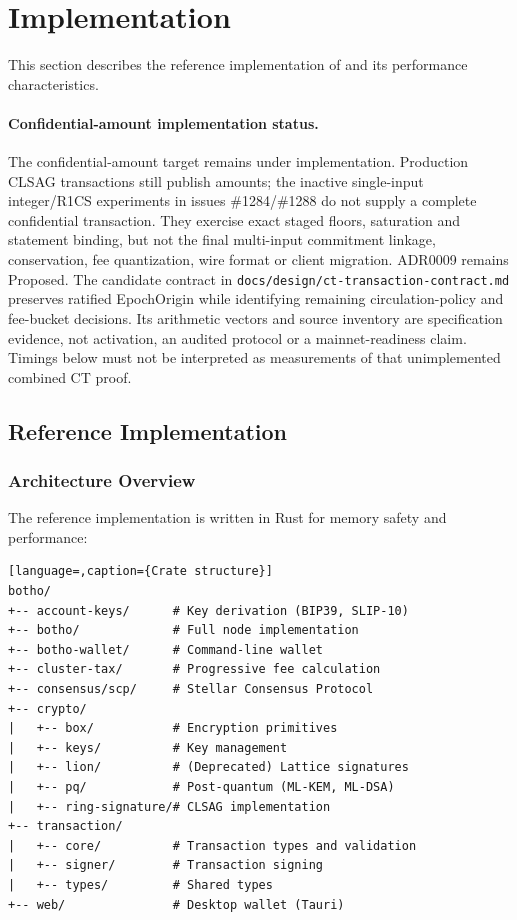 
\section{Implementation}
\label{sec:implementation}

This section describes the reference implementation of \Botho and its
performance characteristics.

\paragraph{Confidential-amount implementation status.}
The confidential-amount target remains under implementation. Production CLSAG
transactions still publish amounts; the inactive single-input integer/R1CS
experiments in issues \#1284/\#1288 do not supply a complete confidential
transaction. They exercise exact staged floors, saturation and statement binding,
but not the final multi-input commitment linkage, conservation, fee quantization,
wire format or client migration. ADR0009 remains Proposed. The candidate contract
in \texttt{docs/design/ct-transaction-contract.md} preserves ratified EpochOrigin
while identifying remaining circulation-policy and fee-bucket decisions.
Its arithmetic vectors and source inventory are specification evidence, not
activation, an audited protocol or a mainnet-readiness claim. Timings below must
not be interpreted as measurements of that unimplemented combined CT proof.

\subsection{Reference Implementation}

\subsubsection{Architecture Overview}

The reference implementation is written in Rust for memory safety and
performance:

\begin{lstlisting}[language=,caption={Crate structure}]
botho/
+-- account-keys/      # Key derivation (BIP39, SLIP-10)
+-- botho/             # Full node implementation
+-- botho-wallet/      # Command-line wallet
+-- cluster-tax/       # Progressive fee calculation
+-- consensus/scp/     # Stellar Consensus Protocol
+-- crypto/
|   +-- box/           # Encryption primitives
|   +-- keys/          # Key management
|   +-- lion/          # (Deprecated) Lattice signatures
|   +-- pq/            # Post-quantum (ML-KEM, ML-DSA)
|   +-- ring-signature/# CLSAG implementation
+-- transaction/
|   +-- core/          # Transaction types and validation
|   +-- signer/        # Transaction signing
|   +-- types/         # Shared types
+-- web/               # Desktop wallet (Tauri)
\end{lstlisting}

